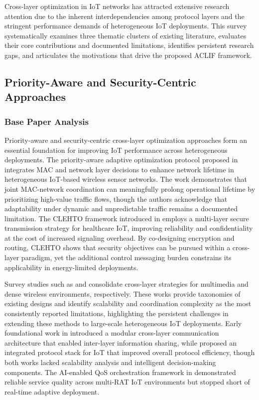 \documentclass[a4paper]{cas-dc}
\numberwithin{equation}{section}
\begin{document}
Cross-layer optimization in IoT networks has attracted extensive research attention due to the inherent interdependencies among protocol layers and the stringent performance demands of heterogeneous IoT deployments. This survey systematically examines three thematic clusters of existing literature, evaluates their core contributions and documented limitations, identifies persistent research gaps, and articulates the motivations that drive the proposed ACLIF framework.

\subsection{Priority-Aware and Security-Centric Approaches}

\subsubsection*{Base Paper Analysis}

Priority-aware and security-centric cross-layer optimization approaches form an essential foundation for improving IoT performance across heterogeneous deployments. The priority-aware adaptive optimization protocol proposed in \cite{Nitya20261578} integrates MAC and network layer decisions to enhance network lifetime in heterogeneous IoT-based wireless sensor networks. The work demonstrates that joint MAC-network coordination can meaningfully prolong operational lifetime by prioritizing high-value traffic flows, though the authors acknowledge that adaptability under dynamic and unpredictable traffic remains a documented limitation. The CLEHTO framework introduced in \cite{Hamrioui2026} employs a multi-layer secure transmission strategy for healthcare IoT, improving reliability and confidentiality at the cost of increased signaling overhead. By co-designing encryption and routing, CLEHTO shows that security objectives can be pursued within a cross-layer paradigm, yet the additional control messaging burden constrains its applicability in energy-limited deployments.

Survey studies such as \cite{De2025} and \cite{Khamzaev2025498} consolidate cross-layer strategies for multimedia and dense wireless environments, respectively. These works provide taxonomies of existing designs and identify scalability and coordination complexity as the most consistently reported limitations, highlighting the persistent challenges in extending these methods to large-scale heterogeneous IoT deployments. Early foundational work in \cite{Han2013622} introduced a modular cross-layer communication architecture that enabled inter-layer information sharing, while \cite{Resner201824} proposed an integrated protocol stack for IoT that improved overall protocol efficiency, though both works lacked scalability analysis and intelligent decision-making components. The AI-enabled QoS orchestration framework in \cite{Zia20221906} demonstrated reliable service quality across multi-RAT IoT environments but stopped short of real-time adaptive deployment.
\end{document}
